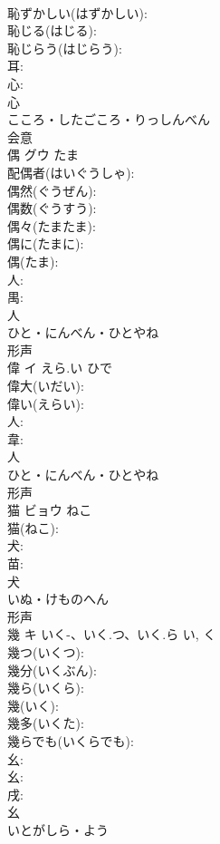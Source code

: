 \documentclass[8pt]{extreport}
\begin{document}
\begin{CJK}{UTF8}{min}
\\	恥ずかしい(はずかしい): 
\\	恥じる(はじる): 
\\	恥じらう(はじらう): 
\\	耳: 
\\	心: 
\\	心	
\\	こころ・したごころ・りっしんべん	
\\	会意 
\\	偶	グウ	たま		
\\	配偶者(はいぐうしゃ): 
\\	偶然(ぐうぜん): 
\\	偶数(ぐうすう): 
\\	偶々(たまたま): 
\\	偶に(たまに): 
\\	偶(たま): 
\\	人: 
\\	禺: 
\\	人	
\\	ひと・にんべん・ひとやね	
\\	形声 
\\	偉	イ	えら.い	ひで	
\\	偉大(いだい): 
\\	偉い(えらい): 
\\	人: 
\\	韋: 
\\	人	
\\	ひと・にんべん・ひとやね	
\\	形声 
\\	猫	ビョウ	ねこ		
\\	猫(ねこ): 
\\	犬: 
\\	苗: 
\\	犬	
\\	いぬ・けものへん	
\\	形声 
\\	幾	キ	いく-、いく.つ、いく.ら	い, く	
\\	幾つ(いくつ): 
\\	幾分(いくぶん): 
\\	幾ら(いくら): 
\\	幾(いく): 
\\	幾多(いくた): 
\\	幾らでも(いくらでも): 
\\	幺: 
\\	幺: 
\\	戌: 
\\	幺	
\\	いとがしら・よう	

\end{CJK}
\end{document}
